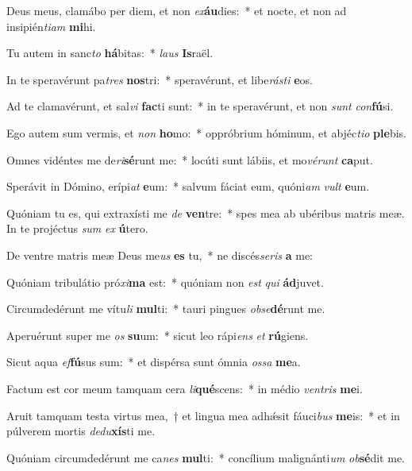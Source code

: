 \item Deus meus, clamábo per diem, et non \textit{ex}\textbf{áu}dies:~* et nocte, et non ad insipién\textit{ti}\textit{am} \textbf{mi}hi.
\item Tu autem in sanc\textit{to} \textbf{há}bitas:~* \textit{laus} \textbf{Is}raël.
\item In te speravérunt pa\textit{tres} \textbf{nos}tri:~* speravérunt, et libe\textit{rás}\textit{ti} \textbf{e}os.
\item Ad te clamavérunt, et sal\textit{vi} \textbf{fac}ti sunt:~* in te speravérunt, et non \textit{sunt} \textit{con}\textbf{fú}si.
\item Ego autem sum vermis, et \textit{non} \textbf{ho}mo:~* oppróbrium hóminum, et abjéc\textit{ti}\textit{o} \textbf{ple}bis.
\item Omnes vidéntes me de\textit{ri}\textbf{sé}runt me:~* locúti sunt lábiis, et mo\textit{vé}\textit{runt} \textbf{ca}put.
\item Sperávit in Dómino, erípi\textit{at} \textbf{e}um:~* salvum fáciat eum, quóni\textit{am} \textit{vult} \textbf{e}um.
\item Quóniam tu es, qui extraxísti me \textit{de} \textbf{ven}tre:~* spes mea ab ubéribus matris meæ. In te projéctus \textit{sum} \textit{ex} \textbf{ú}tero.
\item De ventre matris meæ Deus me\textit{us} \textbf{es} tu,~* ne discés\textit{se}\textit{ris} \textbf{a} me:
\item Quóniam tribulátio pró\textit{xi}\textbf{ma} est:~* quóniam non \textit{est} \textit{qui} \textbf{ád}juvet.
\item Circumdedérunt me vítu\textit{li} \textbf{mul}ti:~* tauri pingues \textit{ob}\textit{se}\textbf{dé}runt me.
\item Aperuérunt super me \textit{os} \textbf{su}um:~* sicut leo rápi\textit{ens} \textit{et} \textbf{rú}giens.
\item Sicut aqua \textit{ef}\textbf{fú}sus sum:~* et dispérsa sunt ómnia \textit{os}\textit{sa} \textbf{me}a.
\item Factum est cor meum tamquam cera \textit{li}\textbf{qué}scens:~* in médio \textit{ven}\textit{tris} \textbf{me}i.
\item Aruit tamquam testa virtus mea,~† et lingua mea adhǽsit fáuci\textit{bus} \textbf{me}is:~* et in púlverem mortis \textit{de}\textit{du}\textbf{xís}ti me.
\item Quóniam circumdedérunt me ca\textit{nes} \textbf{mul}ti:~* concílium malignánti\textit{um} \textit{ob}\textbf{sé}dit me.
